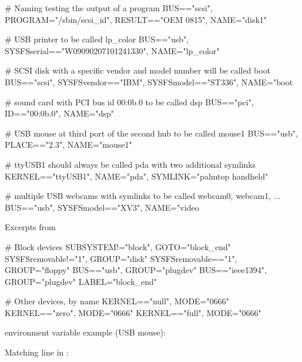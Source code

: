   \begin{block}{}
\tiny
\starttyping
# Naming testing the output of a program
BUS=="scsi", PROGRAM="/sbin/scsi_id", RESULT=="OEM 0815", NAME="disk1"

# USB printer to be called lp_color
BUS=="usb", SYSFS{serial}=="W09090207101241330", NAME="lp_color"

# SCSI disk with a specific vendor and model number will be called boot
BUS=="scsi", SYSFS{vendor}=="IBM", SYSFS{model}=="ST336", NAME="boot%

# sound card with PCI bus id 00:0b.0 to be called dsp
BUS=="pci", ID=="00:0b.0", NAME="dsp"

# USB mouse at third port of the second hub to be called mouse1
BUS=="usb", PLACE=="2.3", NAME="mouse1"

# ttyUSB1 should always be called pda with two additional symlinks
KERNEL=="ttyUSB1", NAME="pda", SYMLINK="palmtop handheld"

# multiple USB webcams with symlinks to be called webcam0, webcam1, ...
BUS=="usb", SYSFS{model}=="XV3", NAME="video%
\stoptyping
  \end{block}

  Excerpts from 
\begin{block}{}
\starttyping
# Block devices
SUBSYSTEM!="block", GOTO="block_end"
SYSFS{removable}!="1", GROUP="disk"
SYSFS{removable}=="1", GROUP="floppy"
BUS=="usb", GROUP="plugdev"
BUS=="ieee1394", GROUP="plugdev"
LABEL="block_end"

# Other devices, by name
KERNEL=="null", MODE="0666"
KERNEL=="zero", MODE="0666"
KERNEL=="full", MODE="0666"
\stoptyping
  \end{block}


  \startitemize
  \item {} environment variable example (USB mouse):\\
  \item Matching line in :\\
  \stopitemize


